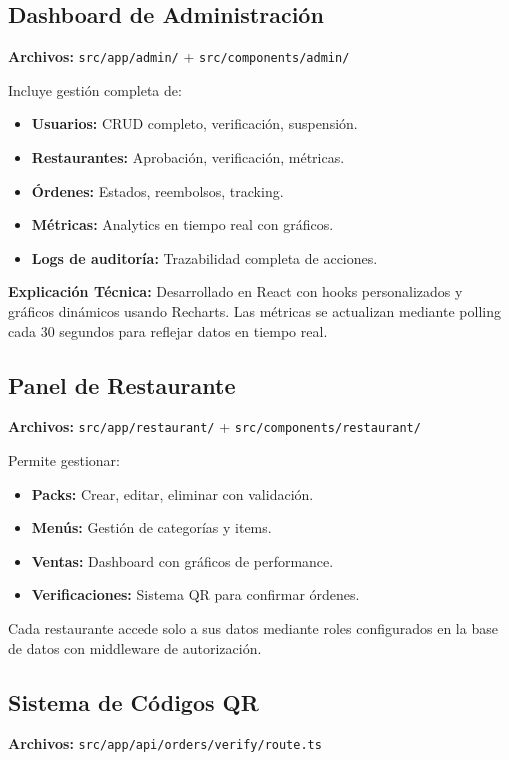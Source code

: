 \documentclass[a4paper,12pt]{article}
\begin{document}
\subsection{Dashboard de Administración}
\textbf{Archivos:} \texttt{src/app/admin/} + \texttt{src/components/admin/}

Incluye gestión completa de:
\begin{itemize}
  \item \textbf{Usuarios:} CRUD completo, verificación, suspensión.
  \item \textbf{Restaurantes:} Aprobación, verificación, métricas.
  \item \textbf{Órdenes:} Estados, reembolsos, tracking.
  \item \textbf{Métricas:} Analytics en tiempo real con gráficos.
  \item \textbf{Logs de auditoría:} Trazabilidad completa de acciones.
\end{itemize}

\textbf{Explicación Técnica:}  
Desarrollado en React con hooks personalizados y gráficos dinámicos usando Recharts. Las métricas se actualizan mediante polling cada 30 segundos para reflejar datos en tiempo real.

\subsection{Panel de Restaurante}
\textbf{Archivos:} \texttt{src/app/restaurant/} + \texttt{src/components/restaurant/}

Permite gestionar:
\begin{itemize}
  \item \textbf{Packs:} Crear, editar, eliminar con validación.
  \item \textbf{Menús:} Gestión de categorías y items.
  \item \textbf{Ventas:} Dashboard con gráficos de performance.
  \item \textbf{Verificaciones:} Sistema QR para confirmar órdenes.
\end{itemize}

Cada restaurante accede solo a sus datos mediante roles configurados en la base de datos con middleware de autorización.

\subsection{Sistema de Códigos QR}
\textbf{Archivos:} \texttt{src/app/api/orders/verify/route.ts}
\end{document}
